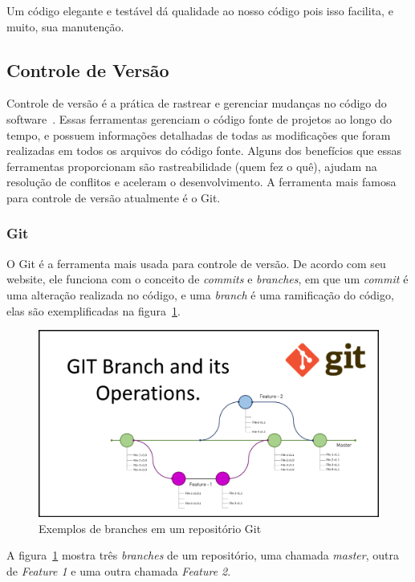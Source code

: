 \documentclass[12pt]{article}
\begin{document}
Um código elegante e testável dá qualidade ao nosso código pois isso facilita, e muito, sua manutenção.

\subsection{Controle de Versão}

Controle de versão é a prática de rastrear e gerenciar mudanças no código do software~\cite{attlasianGit}.
Essas ferramentas gerenciam o código fonte de projetos ao longo do tempo, e possuem informações detalhadas
de todas as modificações que foram realizadas em todos os arquivos do código fonte.
Alguns dos benefícios que essas ferramentas proporcionam são rastreabilidade (quem fez o quê),
ajudam na resolução de conflitos e aceleram o desenvolvimento. A ferramenta mais famosa para controle de
versão atualmente é o Git.

\subsubsection{Git}

O Git é a ferramenta mais usada para controle de versão. De acordo com seu website, ele
funciona com o conceito de \textit{commits} e \textit{branches}, em que um \textit{commit}
é uma alteração realizada no código, e uma \textit{branch} é uma ramificação do código, elas são
exemplificadas na figura~\ref{fig:git-branches}.

\begin{figure}[H]
  \centering
  \includegraphics[width=1\textwidth]{git-branches.png}
  \caption{Exemplos de branches em um repositório Git}\label{fig:git-branches}
\end{figure}

A figura~\ref{fig:git-branches} mostra três \textit{branches} de um repositório,
uma chamada \textit{master}, outra de \textit{Feature 1} e uma outra chamada \textit{Feature 2}.
\end{document}
